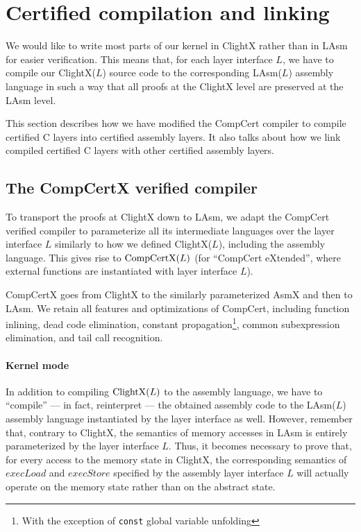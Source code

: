\section{Certified compilation and linking}
\label{sec:seq:comp}

We would like to write most parts of our kernel in ClightX rather than
in LAsm for easier verification.  This means that, for
each layer interface $L$, we have to compile our ClightX($L$) source code to the
corresponding LAsm($L$) assembly language in such a way that all
proofs at the ClightX level are preserved at the LAsm
level.

This section describes how we have modified the CompCert compiler to
compile certified C layers into certified assembly layers. It also talks about
how we link compiled certified C layers with other certified assembly layers. 

\subsection{The CompCertX verified compiler}

To transport the proofs at ClightX down to LAsm, we adapt the CompCert
verified compiler to parameterize all
its intermediate languages over the layer interface $L$ similarly to
how we defined ClightX($L$), including the assembly language. This gives rise to
$\textrm{CompCertX(}L\textrm{)}$ (for ``CompCert eXtended'', where external functions
are instantiated with layer interface $L$).

CompCertX goes from ClightX to the similarly parameterized AsmX and
then to LAsm. We retain all features and optimizations of CompCert,
including function inlining, dead code elimination, 
constant
propagation\footnote{With the exception of \texttt{const} global
  variable unfolding},
common subexpression elimination, and tail call
recognition.


\paragraph{Kernel mode}

In addition to compiling $\textrm{ClightX(}L\textrm{)}$ to the assembly
language,  
we have to ``compile'' --- in fact, reinterpret
--- the obtained assembly code to the LAsm($L$) assembly language
instantiated by the layer interface as well. However, remember that, contrary to
ClightX, the semantics of memory accesses in LAsm is entirely
parameterized by the layer interface $L$. Thus, it becomes necessary to prove
that, for every access to the memory state in ClightX, the
corresponding semantics of $\mathit{execLoad}$ and
$\mathit{execStore}$ specified by the assembly layer interface $L$
will actually operate on the memory state rather than on the abstract
state.


